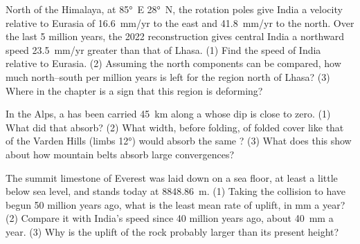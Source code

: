 \begin{exercise}[$\star\star\star$]\label{exo:g12:mountain-building:13}
North of the Himalaya, at \ang{85}~E \ang{28}~N, the rotation poles give India
a velocity relative to Eurasia of \qty{16.6}{mm/yr} to the east and
\qty{41.8}{mm/yr} to the north. Over the last 5 million years, the 2022
reconstruction gives central India a northward speed \qty{23.5}{mm/yr}
greater than that of Lhasa. (1) Find the speed of India relative to
Eurasia. (2) Assuming the north components can be compared, how much
north--south  per million years is left for the region north of
Lhasa? (3) Where in the chapter is a sign that this region is deforming?
\end{exercise}

\begin{exercise}[$\star\star\star$]\label{exo:g12:mountain-building:14}
In the Alps, a  has been carried \qty{45}{km} along a  whose dip is
close to zero. (1) What  did that  absorb? (2) What width,
before folding, of folded cover like that of the Varden Hills (limbs
\ang{12}) would absorb the same ? (3) What does this show about
how mountain belts absorb large convergences?
\end{exercise}

\begin{exercise}[$\star\star\star$]\label{exo:g12:mountain-building:15}
The summit limestone of Everest was laid down on a sea floor, at least a
little below sea level, and stands today at \qty{8848.86}{m}. (1) Taking
the collision to have begun 50 million years ago, what is the least mean
rate of uplift, in \unit{mm} a year? (2) Compare it with India's speed since
40 million years ago, about \qty{40}{mm} a year. (3) Why is the uplift of
the rock probably larger than its present height?
\end{exercise}

